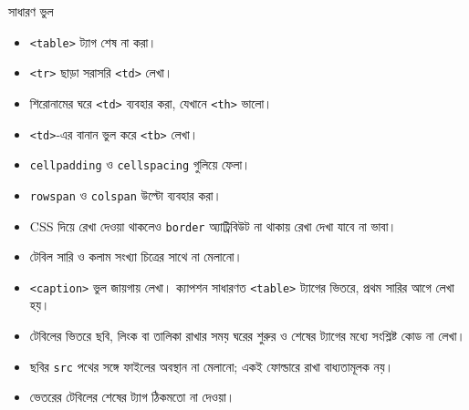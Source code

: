 \begin{mistakebox}{সাধারণ ভুল}
\par\noindent
\begin{minipage}[t]{.48\linewidth}\vspace{0pt}
\begin{itemize}
\item \texttt{<table>} ট্যাগ শেষ না করা।
\item \texttt{<tr>} ছাড়া সরাসরি \texttt{<td>} লেখা।
\item শিরোনামের ঘরে \texttt{<td>} ব্যবহার করা, যেখানে \texttt{<th>} ভালো।
\item \texttt{<td>}-এর বানান ভুল করে \texttt{<tb>} লেখা।
\item \texttt{cellpadding} ও \texttt{cellspacing} গুলিয়ে ফেলা।
\item \texttt{rowspan} ও \texttt{colspan} উল্টো ব্যবহার করা।
\end{itemize}
\end{minipage}\hfill
\begin{minipage}[t]{.48\linewidth}\vspace{0pt}
\begin{itemize}
\item CSS দিয়ে রেখা দেওয়া থাকলেও \texttt{border} অ্যাট্রিবিউট না থাকায় রেখা দেখা যাবে না ভাবা।
\item টেবিল সারি ও কলাম সংখ্যা চিত্রের সাথে না মেলানো।
\item \texttt{<caption>} ভুল জায়গায় লেখা। ক্যাপশন সাধারণত \texttt{<table>} ট্যাগের ভিতরে, প্রথম সারির আগে লেখা হয়।
\item টেবিলের ভিতরে ছবি, লিংক বা তালিকা রাখার সময় ঘরের শুরুর ও শেষের ট্যাগের মধ্যে সংশ্লিষ্ট কোড না লেখা।
\item ছবির \texttt{src} পথের সঙ্গে ফাইলের অবস্থান না মেলানো; একই ফোল্ডারে রাখা বাধ্যতামূলক নয়।
\item ভেতরের টেবিলের শেষের ট্যাগ ঠিকমতো না দেওয়া।
\end{itemize}
\end{minipage}\par

\end{mistakebox}

